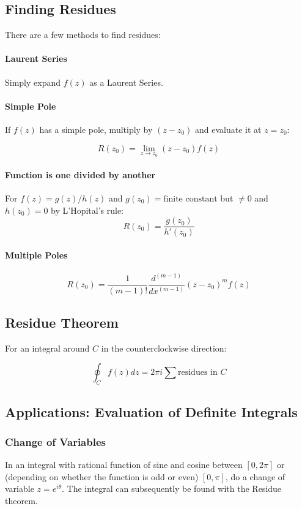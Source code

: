 \documentclass[12pt]{article}
\begin{document}
\subsection{Finding Residues}
There are a few methods to find residues:

\paragraph{Laurent Series}
Simply expand $f(z)$ as a Laurent Series.

\paragraph{Simple Pole}
If $f(z)$ has a simple pole, multiply by $(z-z_0)$ and evaluate it at $z=z_0$:

\[R(z_0) =\lim_{z\to z_0} (z-z_0)f(z)\]

\paragraph{Function is one divided by another}

For $f(z) = g(z)/h(z)$ and $g(z_0) = \text{finite constant}$ but $\neq 0$ and $h(z_0) = 0$ by L'Hopital's rule:
\[ R(z_0) = \frac{g(z_0)}{h'(z_0)}\]

\paragraph{Multiple Poles}

\[R(z_0) = \frac{1}{(m-1)!}\frac{d^{(m-1)}}{dx^{(m-1)}}(z-z_0)^mf(z)\]


\subsection{Residue Theorem}
For an integral around $C$ in the counterclockwise direction:

\[\oint_Cf(z)dz = 2\pi i \sum \text{residues in } C\]

\subsection{Applications: Evaluation of Definite Integrals}

\subsubsection{Change of Variables}
In an integral with rational function of sine and cosine between $[0,2\pi]$ or (depending on whether the function is odd or even) $[0,\pi]$, do a change of variable $z = e^{i\theta}$. The integral can subsequently be found with the Residue theorem.
\end{document}
